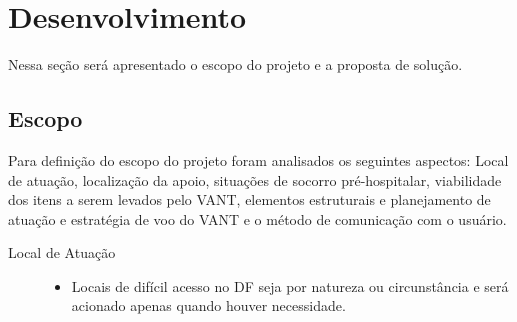 \chapter{Desenvolvimento}\label{cap2}
 Nessa seção será apresentado o escopo do projeto e a proposta de solução.
\section{Escopo}
Para definição do escopo do projeto foram analisados os seguintes aspectos: Local de atuação, localização da apoio, situações de socorro pré-hospitalar, viabilidade dos itens a serem levados pelo VANT, elementos estruturais e planejamento de atuação e estratégia de voo do VANT e o método de comunicação com o usuário.
\begin{description}
  \item[Local de Atuação] \hfill 
  	\begin{itemize}
  		\item Locais de difícil acesso no DF seja por natureza ou circunstância e será acionado apenas quando houver necessidade.


\end{itemize}
\end{description}
